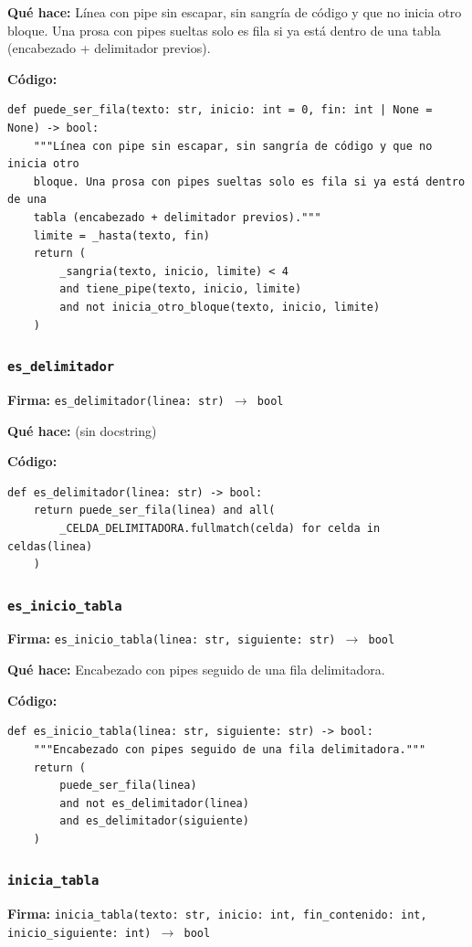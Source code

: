 \documentclass[11pt,a4paper]{article}
\begin{document}
\textbf{Qué hace:} Línea con pipe sin escapar, sin sangría de código y que no inicia otro
bloque. Una prosa con pipes sueltas solo es fila si ya está dentro de una
tabla (encabezado + delimitador previos).

\textbf{Código:}
\begin{lstlisting}
def puede_ser_fila(texto: str, inicio: int = 0, fin: int | None = None) -> bool:
    """Línea con pipe sin escapar, sin sangría de código y que no inicia otro
    bloque. Una prosa con pipes sueltas solo es fila si ya está dentro de una
    tabla (encabezado + delimitador previos)."""
    limite = _hasta(texto, fin)
    return (
        _sangria(texto, inicio, limite) < 4
        and tiene_pipe(texto, inicio, limite)
        and not inicia_otro_bloque(texto, inicio, limite)
    )
\end{lstlisting}

\subsubsection*{\texttt{es\_delimitador}}
\textbf{Firma:} \texttt{es\_delimitador(linea: str) $\rightarrow$ bool}

\textbf{Qué hace:} (sin docstring)

\textbf{Código:}
\begin{lstlisting}
def es_delimitador(linea: str) -> bool:
    return puede_ser_fila(linea) and all(
        _CELDA_DELIMITADORA.fullmatch(celda) for celda in celdas(linea)
    )
\end{lstlisting}

\subsubsection*{\texttt{es\_inicio\_tabla}}
\textbf{Firma:} \texttt{es\_inicio\_tabla(linea: str, siguiente: str) $\rightarrow$ bool}

\textbf{Qué hace:} Encabezado con pipes seguido de una fila delimitadora.

\textbf{Código:}
\begin{lstlisting}
def es_inicio_tabla(linea: str, siguiente: str) -> bool:
    """Encabezado con pipes seguido de una fila delimitadora."""
    return (
        puede_ser_fila(linea)
        and not es_delimitador(linea)
        and es_delimitador(siguiente)
    )
\end{lstlisting}

\subsubsection*{\texttt{inicia\_tabla}}
\textbf{Firma:} \texttt{inicia\_tabla(texto: str, inicio: int, fin\_contenido: int, inicio\_siguiente: int) $\rightarrow$ bool}
\end{document}
